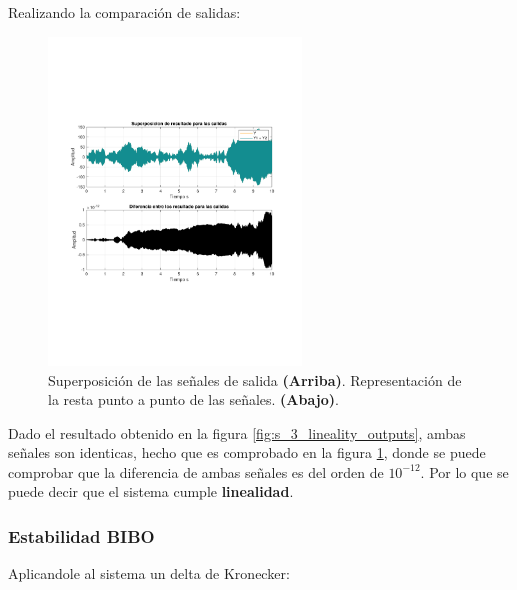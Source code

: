 \newpage			

			Realizando la comparación de salidas:
			\begin{figure}[H]
				\center
				\includegraphics[width=0.6\textwidth,clip, trim = {2cm 7.0cm 2.2cm 7.0cm}]{../imgs/sistema_3_linealidad_superpuestas.pdf}
				\caption{Superposición de las señales de salida \textbf{(Arriba)}. Representación de la resta punto a punto de las señales. \textbf{(Abajo)}.}
				\label{fig:s_3_lineality_superposition}
			\end{figure}
			
			Dado el resultado obtenido en la figura \ref{fig:s_3_lineality_outputs}, ambas señales son identicas, hecho que es comprobado en la figura \ref{fig:s_3_lineality_superposition}, donde se puede comprobar que la diferencia de ambas señales es del orden de $10^{-12}$. Por lo que se puede decir que el sistema cumple \textbf{linealidad}.
			
		\subsubsection{Estabilidad BIBO}
			Aplicandole al sistema un delta de Kronecker:
		
